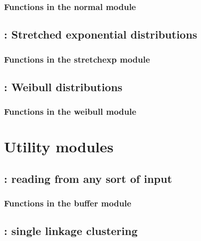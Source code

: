 \documentclass[10pt]{book}
\begin{document}
\subsection{Functions in the normal module}


\newpage
\section{: Stretched exponential distributions}

\subsection{Functions in the stretchexp module}


\newpage
\section{: Weibull distributions}

\subsection{Functions in the weibull module}


\newpage
\chapter{Utility modules}

\newpage
\section{: reading from any sort of input}

\subsection{Functions in the buffer module}


\newpage
\section{: single linkage clustering}

\end{document}
